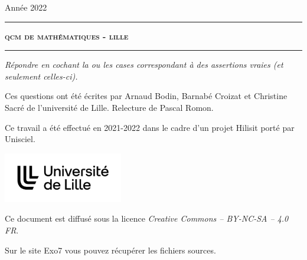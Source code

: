 \documentclass[11pt,a4paper]{article}
\begin{document}
 
 


\hfill{Année 2022}

\vspace*{0.5ex}
\hrule\vspace*{1.5ex} 
\hfil\textsc{\textbf{\LARGE qcm de mathématiques - lille}}
\vspace*{1.2ex} \hrule 
\vspace*{5ex} 


\vspace{4cm}

\begin{center}
\begin{minipage}{0.8\textwidth}
\center
\textit{Répondre en cochant la ou les cases correspondant à des assertions vraies (et seulement celles-ci).}
\end{minipage}
\end{center}
  
  


\vfill

\begin{center}
\begin{minipage}{0.8\textwidth}
\center
Ces questions ont été écrites par Arnaud Bodin, Barnabé Croizat et Christine Sacré de l'université de Lille. Relecture de Pascal Romon.
  
  \medskip
  
Ce travail a été effectué en 2021-2022 dans le cadre d'un projet Hilisit porté par Unisciel.
\end{minipage}

  \medskip

\qquad\qquad
\includegraphics[height=2.2cm]{logo-ulille}

  \medskip
  
Ce document est diffusé sous la licence \emph{Creative Commons -- BY-NC-SA -- 4.0 FR}.


Sur le site Exo7 vous pouvez récupérer les fichiers sources.

\end{center}


\newpage




\end{document}
